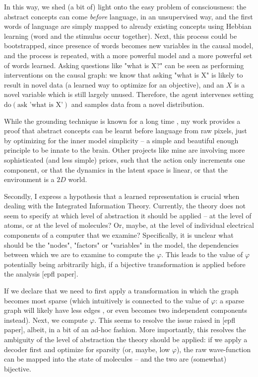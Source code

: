 \documentclass[a4paper,11pt,oneside]{report}
\begin{document}
In this way, we shed (a bit of) light onto the easy problem of consciousness: the abstract concepts can come {\em before} language, in an unsupervised way, and the first words of language are simply mapped to already existing concepts using Hebbian learning (word and the stimulus occur together). Next, this process could be bootstrapped, since presence of words becomes new variables in the causal model, and the process is repeated, with a more powerful model and a more powerful set of words learned. Asking questions like "what is X?" can be seen as performing interventions on the causal graph: we know that asking "what is X" is likely to result in novel data (a learned way to optimize for an objective), and an $X$ is a novel variable which is still largely unused. Therefore, the agent intervenes setting $\mbox{do}(\mbox{ask 'what is X'})$ and samples data from a novel distribution.

While the grounding technique is known for a long time \cite{Hofstadter1994}, my work provides a proof that abstract concepts can be learnt before language from raw pixels, just by optimizing for the inner model simplicity -- a simple and beautiful enough principle to be innate to the brain\cite{Babadi2014}. Other projects like mine are involving more sophisticated (and less simple) priors, such that the action only increments one component, or that the dynamics in the latent space is linear, or that the environment is a $2D$ world.

Secondly, I express a hypothesis that a learned representation is crucial when dealing with the Integrated Information Theory\cite{Tononi2016}. Currently, the theory does not seem to specify at which level of abstraction it should be applied -- at the level of atoms, or at the level of molecules? Or, maybe, at the level of individual electrical components of a computer that we examine? Specifically, it is unclear what should be the "nodes", "factors" or "variables" in the model, the dependencies between which we are to examine to compute the $\varphi$. This leads to the value of $\varphi$ potentially being arbitrarily high, if a bijective transformation is applied before the analysis [epfl paper].

If we declare that we need to first apply a transformation in which the graph becomes most sparse (which intuitively is connected to the value of $\varphi$: a sparse graph will likely have less edges \cite{Seth2011}, or even becomes two independent components instead). Next, we compute $\varphi$. This seems to resolve the issue raised in [epfl paper], albeit, in a bit of an ad-hoc fashion. More importantly, this resolves the ambiguity of the level of abstraction the theory should be applied: if we apply a decoder first and optimize for sparsity (or, maybe, low $\varphi$), the raw wave-function can be mapped into the state of molecules -- and the two are (somewhat) bijective.
\end{document}

